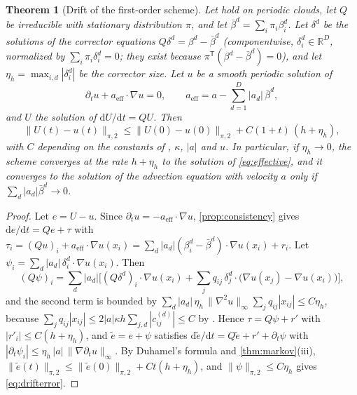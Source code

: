 \documentclass[11pt,a4paper]{article}
\theoremstyle{plain}
\newtheorem{theorem}{Theorem}[section]
\theoremstyle{definition}
\theoremstyle{remark}
\numberwithin{equation}{section}
\newcommand{\R}{\mathbb{R}}
\newcommand{\dd}{\mathrm{d}}
\newcommand{\A}[1]{\cite[#1]{Addendum}}
\begin{document}
\begin{theorem}[Drift of the first-order scheme]\label{thm:drift}
Let \A{Ass.~2.1} hold on periodic clouds, let $Q$ be irreducible with stationary distribution $\pi$, and let $\bar\beta^d=\sum_i\pi_i\beta^d_i$. Let $\delta^d$ be the solutions of the corrector equations $Q\delta^{d}=\beta^{d}-\bar\beta^{d}$ (componentwise, $\delta^d_i\in\R^D$, normalized by $\sum_i\pi_i\delta^d_i=0$; they exist because $\pi^{\mathsf T}(\beta^d-\bar\beta^d)=0$), and let $\eta_h=\max_{i,d}|\delta^d_i|$ be the \emph{corrector size}. Let $u$ be a smooth periodic solution of
\begin{equation}\label{eq:effective}
\partial_tu+a_{\mathrm{eff}}\cdot\nabla u=0,\qquad a_{\mathrm{eff}}=a-\sum_{d=1}^D|a_d|\,\bar\beta^{d},
\end{equation}
and $U$ the solution of $\dd U/\dd t=QU$. Then
\begin{equation}\label{eq:drifterror}
\|U(t)-u(t)\|_{\pi,2}\le\|U(0)-u(0)\|_{\pi,2}+C(1+t)\,(h+\eta_h),
\end{equation}
with $C$ depending on the constants of \A{Ass.~2.1}, $\kappa$, $|a|$ and $u$. In particular, if $\eta_h\to0$, the scheme converges at the rate $h+\eta_h$ to the solution of \eqref{eq:effective}, and it converges to the solution of the advection equation with velocity $a$ only if $\sum_d|a_d|\bar\beta^d\to0$.
\end{theorem}

\begin{proof}
Let $e=U-u$. Since $\partial_tu=-a_{\mathrm{eff}}\cdot\nabla u$, \cref{prop:consistency} gives $\dd e/\dd t=Qe+\tau$ with $\tau_i=(Qu)_i+a_{\mathrm{eff}}\cdot\nabla u(x_i)=\sum_d|a_d|(\beta^d_i-\bar\beta^d)\cdot\nabla u(x_i)+r_i$. Let $\psi_i=\sum_d|a_d|\,\delta^d_i\cdot\nabla u(x_i)$. Then
\[
(Q\psi)_i=\sum_d|a_d|\Big[(Q\delta^d)_i\cdot\nabla u(x_i)+\sum_jq_{ij}\,\delta^d_j\cdot\big(\nabla u(x_j)-\nabla u(x_i)\big)\Big],
\]
and the second term is bounded by $\sum_d|a_d|\,\eta_h\,\|\nabla^2u\|_\infty\sum_jq_{ij}|x_{ij}|\le C\eta_h$, because $\sum_jq_{ij}|x_{ij}|\le2|a|\kappa h\sum_{j,d}|c^{(d)}_{ij}|\le C$ by \A{Lem.~3.5}. Hence $\tau=Q\psi+r'$ with $|r'_i|\le C(h+\eta_h)$, and $\tilde e=e+\psi$ satisfies $\dd\tilde e/\dd t=Q\tilde e+r'+\partial_t\psi$ with $|\partial_t\psi_i|\le \eta_h\,|a|\,\|\nabla\partial_tu\|_\infty$. By Duhamel's formula and \cref{thm:markov}(iii), $\|\tilde e(t)\|_{\pi,2}\le\|\tilde e(0)\|_{\pi,2}+Ct(h+\eta_h)$, and $\|\psi\|_{\pi,2}\le C\eta_h$ gives \eqref{eq:drifterror}.
\end{proof}
\end{document}
